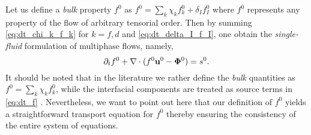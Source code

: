 Let us define a \textit{bulk} property $f^0$ as $f^0 = \sum_{k} \chi_k f_k^0 + \delta_I f_I^0$ where $f^0$ represents any property of the flow of arbitrary tensorial order.
Then by summing \ref{eq:dt_chi_k_f_k} for $k=f,d$ and \ref{eq:dt_delta_I_f_I}, one obtain the \textit{single-fluid} formulation of multiphase flows, namely,
\begin{equation}
   \partial_t f^0
   + \mathbf{\nabla}\cdot (
       f^0 \textbf{u}^0
       -  \mathbf{\Phi}^0 
    )
   = s^0. 
   \label{eq:dt_f}
\end{equation}
It should be noted that in the literature we rather define the \textit{bulk} quantities as $f^0 = \sum_k \chi_k f_k^0$, while the interfacial components are treated as source terms in \ref{eq:dt_f} \citep{morel2015mathematical,tryggvason2011direct,drew1983mathematical}. 
Nevertheless, we want to point out here that our definition of $f^0$ yields a straightforward transport equation for $f^0$ thereby ensuring the consistency of the entire system of equations.



